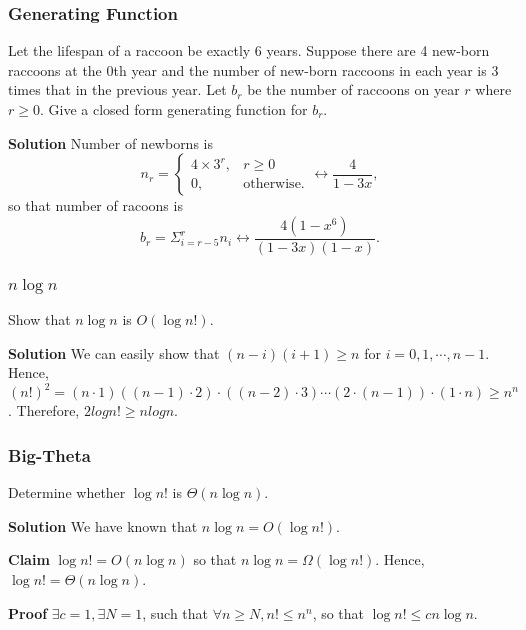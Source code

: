 \documentclass[10pt, compress]{beamer}
\begin{document}
\begin{frame}[fragile]
\frametitle{Generating Function}
Let the lifespan of a raccoon be exactly 6 years. Suppose there are 4 new-born raccoons at the 0th year and the number of new-born raccoons in each year is 3 times that in the previous year. Let $b_r$ be the number of raccoons on year $r$ where $r \ge 0$. Give a closed form generating function for $b_r$.

\textbf{Solution} Number of newborns is \begin{equation}
n_r = \begin{cases}
4 \times 3^r, & r \ge 0\\
0, & \text{otherwise}.
\end{cases} \leftrightarrow \frac{4}{1 - 3x},
\end{equation} so that number of racoons is \begin{equation}
b_r = \Sigma_{i = r - 5}^{r} n_i \leftrightarrow \frac{4(1 - x^6)}{(1 - 3x)(1 - x)}.
\end{equation}
\end{frame}

\begin{frame}[fragile]
\frametitle{$n \log n$}
Show that $n \log n$ is $O(\log n!)$.

\textbf{Solution} We
can easily show that $(n - i)(i + 1) \ge n$ for $i = 0, 1, \cdots, n - 1$.
Hence, $(n!)^2 = (n \cdot 1)((n - 1) \cdot 2) \cdot ((n - 2) \cdot 3) \cdots (2 \cdot (n -
1)) \cdot (1 \cdot n) \ge n^n$. Therefore, $2 log n! \ge n log n$.
\end{frame}

\begin{frame}[fragile]
\frametitle{Big-Theta}
Determine whether $\log n!$ is $\Theta(n \log n)$.

\textbf{Solution} We have known that $n \log n = O(\log n!)$.

\textbf{Claim} $\log n! = O(n \log n)$ so that $n \log n = \Omega(\log n!)$. Hence, $\log n! = \Theta(n \log n)$.

\textbf{Proof} $\exists c = 1, \exists N = 1$, such that $\forall n \ge N, n! \le n^n$, so that $\log n! \le c n\log n$.

\end{frame}
\end{document}
